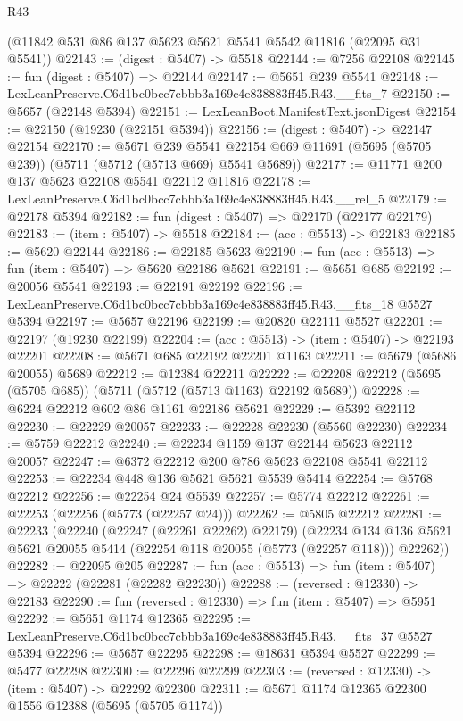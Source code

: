 \begin{lexlean}{R43}
\begin{coremodule}
    (@11842 @531 @86 @137 @5623 @5621 @5541 @5542 @11816 (@22095 @31 @5541))
@22143 := (digest : @5407) -> @5518
@22144 := @7256 @22108
@22145 := fun (digest : @5407) => @22144
@22147 := @5651 @239 @5541
@22148 := LexLeanPreserve.C6d1bc0bcc7cbbb3a169c4e838883ff45.R43.__fits_7
@22150 := @5657 (@22148 @5394)
@22151 := LexLeanBoot.ManifestText.jsonDigest
@22154 := @22150 (@19230 (@22151 @5394))
@22156 := (digest : @5407) -> @22147 @22154
@22170 := @5671
    @239
    @5541
    @22154
    @669
    @11691
    (@5695 (@5705 @239))
    (@5711 (@5712 (@5713 @669) @5541 @5689))
@22177 := @11771 @200 @137 @5623 @22108 @5541 @22112 @11816
@22178 := LexLeanPreserve.C6d1bc0bcc7cbbb3a169c4e838883ff45.R43.__rel_5
@22179 := @22178 @5394
@22182 := fun (digest : @5407) => @22170 (@22177 @22179)
@22183 := (item : @5407) -> @5518
@22184 := (acc : @5513) -> @22183
@22185 := @5620 @22144
@22186 := @22185 @5623
@22190 := fun (acc : @5513) => fun (item : @5407) => @5620 @22186 @5621
@22191 := @5651 @685
@22192 := @20056 @5541
@22193 := @22191 @22192
@22196 := LexLeanPreserve.C6d1bc0bcc7cbbb3a169c4e838883ff45.R43.__fits_18 @5527 @5394
@22197 := @5657 @22196
@22199 := @20820 @22111 @5527
@22201 := @22197 (@19230 @22199)
@22204 := (acc : @5513) -> (item : @5407) -> @22193 @22201
@22208 := @5671 @685 @22192 @22201 @1163
@22211 := @5679 (@5686 @20055) @5689
@22212 := @12384 @22211
@22222 := @22208 @22212 (@5695 (@5705 @685)) (@5711 (@5712 (@5713 @1163) @22192 @5689))
@22228 := @6224 @22212 @602 @86 @1161 @22186 @5621
@22229 := @5392 @22112
@22230 := @22229 @20057
@22233 := @22228 @22230 (@5560 @22230)
@22234 := @5759 @22212
@22240 := @22234 @1159 @137 @22144 @5623 @22112 @20057
@22247 := @6372 @22212 @200 @786 @5623 @22108 @5541 @22112
@22253 := @22234 @448 @136 @5621 @5621 @5539 @5414
@22254 := @5768 @22212
@22256 := @22254 @24 @5539
@22257 := @5774 @22212
@22261 := @22253 (@22256 (@5773 (@22257 @24)))
@22262 := @5805 @22212
@22281 := @22233
    (@22240
      (@22247 (@22261 @22262) @22179)
      (@22234 @134 @136 @5621 @5621 @20055 @5414 (@22254 @118 @20055 (@5773 (@22257 @118))) @22262))
@22282 := @22095 @205
@22287 := fun (acc : @5513) => fun (item : @5407) => @22222 (@22281 (@22282 @22230))
@22288 := (reversed : @12330) -> @22183
@22290 := fun (reversed : @12330) => fun (item : @5407) => @5951
@22292 := @5651 @1174 @12365
@22295 := LexLeanPreserve.C6d1bc0bcc7cbbb3a169c4e838883ff45.R43.__fits_37 @5527 @5394
@22296 := @5657 @22295
@22298 := @18631 @5394 @5527
@22299 := @5477 @22298
@22300 := @22296 @22299
@22303 := (reversed : @12330) -> (item : @5407) -> @22292 @22300
@22311 := @5671 @1174 @12365 @22300 @1556 @12388 (@5695 (@5705 @1174))

\end{coremodule}
\end{lexlean}
